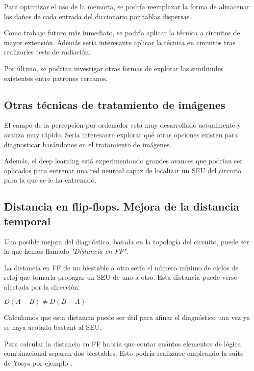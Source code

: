 Para optimizar el uso de la memoria, se podría reemplazar la forma de almacenar
los daños de cada entrada del diccionario por tablas dispersas.

Como trabajo futuro más inmediato, se podría aplicar la técnica a circuitos de
mayor extensión. Además sería interesante aplicar la técnica en circuitos tras
realizarles tests de radiación.

Por último, se podrían investigar otras formas de explotar las similitudes
existentes entre patrones cercanos.

\subsection{Otras técnicas de tratamiento de imágenes}
\label{subsec:OtrasTecnicasImag}
El campo de la percepción por ordenador está muy desarrollado actualmente y avanza
muy rápido. Sería interesante explorar qué otras opciones existen para
diagnosticar basándonos en el tratamiento de imágenes.



Además, el deep learning está experimentando grandes avances que podrían ser
aplicados para entrenar una red neuroal capaz de localizar un \gls{SEU} del
circuito para la que se le ha entrenado.


\subsection{Distancia en flip-flops. Mejora de la distancia temporal}
\label{subsec:FFdist}
Una posible mejora del diagnóstico, basada en la topología del circuito, puede ser
la que hemos llamado \textit{"Distancia en FF"}.

La distancia en \gls{FF} de un biestable a otro sería el número mínimo de ciclos
de reloj que tomaría propagar un \gls{SEU} de uno a otro. Esta distancia puede
verse afectada por la dirección: 

\begin{center}
    $D(A-B) \neq D(B-A)$
\end{center}

Calculamos que esta distancia puede ser útil para afinar el diagnóstico una vez ya
se haya acotado bastant al \gls{SEU}.

Para calcular la distancia en FF habría que contar cuántos elementos de lógica
combinacional separan dos biestables. Esto podría realizarse empleando la suite de 
Yosys por ejemplo \cite{YOSYS}.

\endinput
